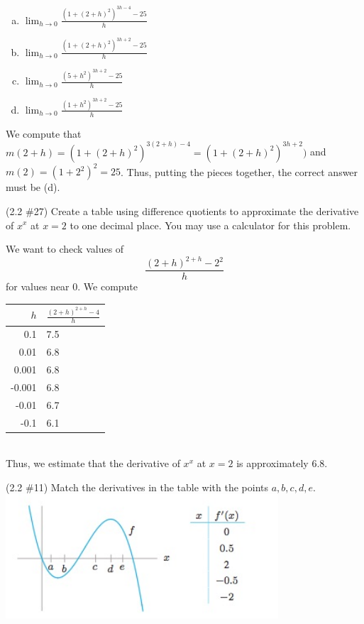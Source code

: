 \documentclass[11pt]{exam}
\begin{document}
\begin{questions}
\begin{multicols}{2}
\begin{enumerate}[(a)]
\item $\displaystyle\lim_{h \rightarrow 0} \frac{(1+(2+h)^2)^{3h-4}- 25}{h}$
\item $\displaystyle\lim_{h \rightarrow 0} \frac{(1+(2+h)^2)^{3h+2}- 25}{h}$
\item $\displaystyle\lim_{h \rightarrow 0} \frac{(5+h^2)^{3h+2}- 25}{h}$
\item $\displaystyle\lim_{h \rightarrow 0} \frac{(1+h^2)^{3h+2}- 25}{h}$
\end{enumerate}
\end{multicols}
\begin{solution}
  We compute that \(m(2+h) = (1+(2+h)^2)^{3(2+h)-4} =
  (1+(2+h)^2)^{3h+2})\) and \(m(2)=(1+2^2)^{2} = 25\). Thus, putting
  the pieces together, the correct answer must be (d).
\end{solution}
\question (2.2 \#27) Create a table using difference quotients to
  approximate the derivative of $x^x$ at $x=2$ to one decimal
  place. You may use a calculator for this problem.
  \begin{solution}
    We want to check values of \[
      \frac{(2+h)^{2+h}-2^2}{h}
    \]
    for values near \(0\). We compute\\
    \begin{tabular}{|r|l|}
      \hline \(h\) & \(\frac{(2+h)^{2+h}-4}{h}\)\\
      \hline 0.1 & 7.5 \\
      \hline 0.01 & 6.8\\
      \hline 0.001 & 6.8\\
      \hline -0.001 & 6.8\\
      \hline -0.01 & 6.7\\
      \hline -0.1 & 6.1\\
      \hline
    \end{tabular}\\
    Thus, we estimate that the derivative of \(x^x\) at \(x=2\) is
    approximately \(6.8\).
  \end{solution}
\question  (2.2 \#11)  Match the derivatives in the table with the points $a,b,c,d,e$.\\
	\includegraphics[width=4in]{Figures/no11.jpg}

\end{questions}
\end{document}
